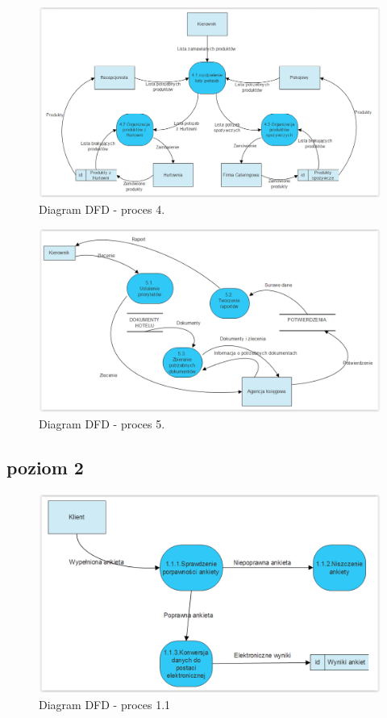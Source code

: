 \documentclass[a4paper, 11pt]{article}
\begin{document}
	\begin{figure}[H]%
			\center
			\includegraphics[scale=0.7]{Img/4.png}
			\caption{Diagram DFD - proces 4.}
	\end{figure}
	\begin{figure}[H]%
			\center
			\includegraphics[scale=0.7]{Img/5.png}
			\caption{Diagram DFD - proces 5.}
	\end{figure}


	\subsection{poziom 2}
	\indent
	\begin{figure}[H]%
			\center
			\includegraphics[scale=0.7]{Img/1-1.png}
			\caption{Diagram DFD - proces 1.1}
	\end{figure}
\end{document}
